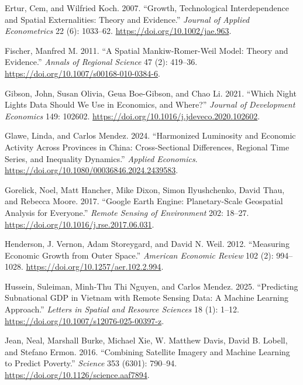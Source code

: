 \documentclass[
  letterpaper,
  DIV=11,
  numbers=noendperiod]{scrartcl}
\newlength{\cslhangindent}
\newenvironment{CSLReferences}[2] %
 {\begin{list}{}{%
  \setlength{\itemindent}{0pt}
  \setlength{\leftmargin}{0pt}
  \setlength{\parsep}{0pt}
  \ifodd #1
   \setlength{\leftmargin}{\cslhangindent}
   \setlength{\itemindent}{-1\cslhangindent}
  \fi
  \setlength{\itemsep}{#2\baselineskip}}}
 {\end{list}}
\begin{document}
\begin{CSLReferences}{1}{0}
Ertur, Cem, and Wilfried Koch. 2007. {``Growth, Technological
Interdependence and Spatial Externalities: Theory and Evidence.''}
\emph{Journal of Applied Econometrics} 22 (6): 1033--62.
\url{https://doi.org/10.1002/jae.963}.

Fischer, Manfred M. 2011. {``A Spatial Mankiw-Romer-Weil Model: Theory
and Evidence.''} \emph{Annals of Regional Science} 47 (2): 419--36.
\url{https://doi.org/10.1007/s00168-010-0384-6}.

Gibson, John, Susan Olivia, Geua Boe-Gibson, and Chao Li. 2021. {``Which
Night Lights Data Should We Use in Economics, and Where?''}
\emph{Journal of Development Economics} 149: 102602.
\url{https://doi.org/10.1016/j.jdeveco.2020.102602}.

Glawe, Linda, and Carlos Mendez. 2024. {``Harmonized Luminosity and
Economic Activity Across Provinces in {China}: {Cross}-Sectional
Differences, Regional Time Series, and Inequality Dynamics.''}
\emph{Applied Economics}.
\url{https://doi.org/10.1080/00036846.2024.2439583}.

Gorelick, Noel, Matt Hancher, Mike Dixon, Simon Ilyushchenko, David
Thau, and Rebecca Moore. 2017. {``Google {E}arth {E}ngine:
Planetary-Scale Geospatial Analysis for Everyone.''} \emph{Remote
Sensing of Environment} 202: 18--27.
\url{https://doi.org/10.1016/j.rse.2017.06.031}.

Henderson, J. Vernon, Adam Storeygard, and David N. Weil. 2012.
{``Measuring Economic Growth from Outer Space.''} \emph{American
Economic Review} 102 (2): 994--1028.
\url{https://doi.org/10.1257/aer.102.2.994}.

Hussein, Suleiman, Minh-Thu Thi Nguyen, and Carlos Mendez. 2025.
{``Predicting Subnational {GDP} in {Vietnam} with Remote Sensing Data:
{A} Machine Learning Approach.''} \emph{Letters in Spatial and Resource
Sciences} 18 (1): 1--12.
\url{https://doi.org/10.1007/s12076-025-00397-z}.

Jean, Neal, Marshall Burke, Michael Xie, W. Matthew Davis, David B.
Lobell, and Stefano Ermon. 2016. {``Combining Satellite Imagery and
Machine Learning to Predict Poverty.''} \emph{Science} 353 (6301):
790--94. \url{https://doi.org/10.1126/science.aaf7894}.


\end{CSLReferences}
\end{document}
